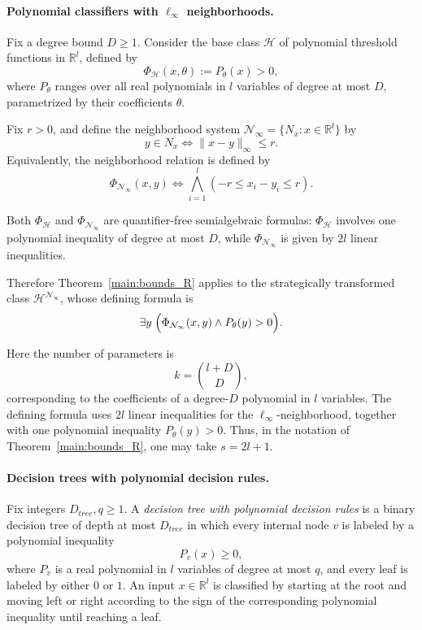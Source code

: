 \documentclass[11pt]{article}
\theoremstyle{plain}
\theoremstyle{definition}
\theoremstyle{remark}
\newcommand{\R}{\mathbb{R}}
\begin{document}
\paragraph{Polynomial classifiers with \(\ell_\infty\) neighborhoods.}

Fix a degree bound \(D\ge 1\). Consider the base class \(\mathcal H\) of polynomial
threshold functions in \(\R^l\), defined by
\[
  \Phi_{\mathcal H}(x,\theta)
  :=
  P_\theta(x)>0,
\]
where \(P_\theta\) ranges over all real polynomials in \(l\) variables of degree
at most \(D\), parametrized by their coefficients \(\theta\).

Fix \(r>0\), and define the neighborhood system
\(\mathcal N_\infty=\{N_x:x\in\R^l\}\) by
\[
  y\in N_x
  \iff
  \|x-y\|_\infty \le r .
\]
Equivalently, the neighborhood relation is defined by
\[
  \Phi_{\mathcal N_\infty}(x,y)
  \iff
  \bigwedge_{i=1}^l
  \left(
    -r \le x_i-y_i \le r
  \right).
\]

Both \(\Phi_{\mathcal H}\) and \(\Phi_{\mathcal N_\infty}\) are
quantifier-free semialgebraic formulas:
\(\Phi_{\mathcal H}\) involves one polynomial inequality of degree at most \(D\),
while \(\Phi_{\mathcal N_\infty}\) is given by \(2l\) linear inequalities.

Therefore Theorem~\ref{main:bounds_R} applies to the strategically transformed
class \(\mathcal H^{\mathcal N_\infty}\), whose defining formula is
\[
  \exists y\;
  \Bigl(
    \Phi_{\mathcal N_\infty}(x,y)
    \wedge
    P_\theta(y)>0
  \Bigr).
\]

Here the number of parameters is
\[
k=\binom{l+D}{D},
\]
corresponding to the coefficients of a degree-\(D\) polynomial in \(l\)
variables. The defining formula uses \(2l\) linear inequalities for the
\(\ell_\infty\)-neighborhood, together with one polynomial inequality
\(P_\theta(y)>0\). Thus, in the notation of
Theorem~\ref{main:bounds_R}, one may take \(s=2l+1\).

\paragraph{Decision trees with polynomial decision rules.}

Fix integers \(D_{tree},q\ge 1\). A \emph{decision tree with polynomial
decision rules} is a binary decision tree of depth at most \(D_{tree}\) in
which every internal node \(v\) is labeled by a polynomial inequality
\[
P_v(x)\ge 0,
\]
where \(P_v\) is a real polynomial in \(l\) variables of degree at most \(q\),
and every leaf is labeled by either \(0\) or \(1\). An input \(x\in\R^l\) is
classified by starting at the root and moving left or right according to the
sign of the corresponding polynomial inequality until reaching a leaf.
\end{document}
